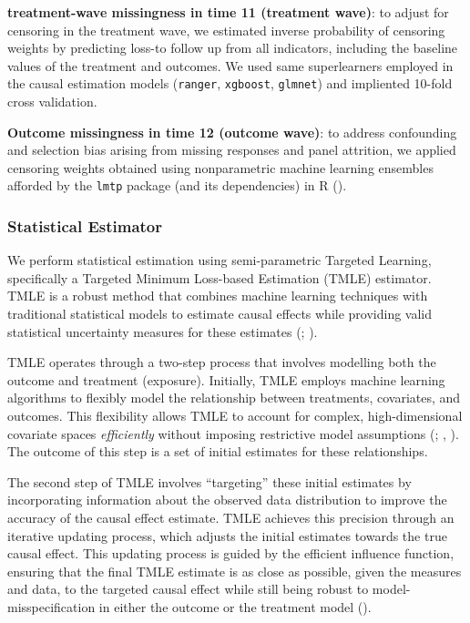 \documentclass[
  single column]{article}
\begin{document}
\textbf{treatment-wave missingness in time 11 (treatment wave)}: to
adjust for censoring in the treatment wave, we estimated inverse
probability of censoring weights by predicting loss-to follow up from
all indicators, including the baseline values of the treatment and
outcomes. We used same superlearners employed in the causal estimation
models (\texttt{ranger}, \texttt{xgboost}, \texttt{glmnet}) and
impliented 10-fold cross validation.

\textbf{Outcome missingness in time 12 (outcome wave)}: to address
confounding and selection bias arising from missing responses and panel
attrition, we applied censoring weights obtained using nonparametric
machine learning ensembles afforded by the \texttt{lmtp} package (and
its dependencies) in R ().

\subsubsection{Statistical Estimator}\label{statistical-estimator}

We perform statistical estimation using semi-parametric Targeted
Learning, specifically a Targeted Minimum Loss-based Estimation (TMLE)
estimator. TMLE is a robust method that combines machine learning
techniques with traditional statistical models to estimate causal
effects while providing valid statistical uncertainty measures for these
estimates (;
).

TMLE operates through a two-step process that involves modelling both
the outcome and treatment (exposure). Initially, TMLE employs machine
learning algorithms to flexibly model the relationship between
treatments, covariates, and outcomes. This flexibility allows TMLE to
account for complex, high-dimensional covariate spaces
\emph{efficiently} without imposing restrictive model assumptions
(;
,
). The outcome of this step is a set
of initial estimates for these relationships.

The second step of TMLE involves ``targeting'' these initial estimates
by incorporating information about the observed data distribution to
improve the accuracy of the causal effect estimate. TMLE achieves this
precision through an iterative updating process, which adjusts the
initial estimates towards the true causal effect. This updating process
is guided by the efficient influence function, ensuring that the final
TMLE estimate is as close as possible, given the measures and data, to
the targeted causal effect while still being robust to
model-misspecification in either the outcome or the treatment model
().
\end{document}
